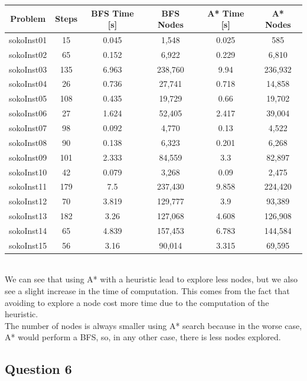 \documentclass[a4paper,10pt]{article}
\begin{document}
			\begin{tabular}{|c||c||c|c||c|c|}
				\hline 
				\textbf{Problem} & \textbf{Steps} & \textbf{BFS Time [s]} & \textbf{BFS Nodes} & \textbf{A* Time [s]} & \textbf{A* Nodes} \\ 
				\hline 
				sokoInst01 & 15 & 0.045 & 1,548 & 0.025 & 585 \\ 
				\hline
				sokoInst02 & 65 & 0.152 & 6,922 & 0.229 & 6,810 \\ 
				\hline
				sokoInst03 & 135 & 6.963 & 238,760 & 9.94 & 236,932 \\ 
				\hline
				sokoInst04 & 26 & 0.736 & 27,741 & 0.718 & 14,858 \\ 
				\hline
				sokoInst05 & 108 & 0.435 & 19,729 & 0.66 & 19,702 \\ 
				\hline
				sokoInst06 & 27 & 1.624 & 52,405 & 2.417 & 39,004 \\ 
				\hline
				sokoInst07 & 98 & 0.092 & 4,770 & 0.13 & 4,522 \\ 
				\hline
				sokoInst08 & 90 & 0.138 & 6,323 & 0.201 & 6,268 \\ 
				\hline
				sokoInst09 & 101 & 2.333 & 84,559 & 3.3 & 82,897 \\ 
				\hline
				sokoInst10 & 42 & 0.079 & 3,268 & 0.09 & 2,475 \\ 
				\hline
				sokoInst11 & 179 & 7.5 & 237,430 & 9.858 & 224,420 \\ 
				\hline
				sokoInst12 & 70 & 3.819 & 129,777 & 3.9 & 93,389 \\ 
				\hline
				sokoInst13 & 182 & 3.26 & 127,068 & 4.608 & 126,908 \\ 
				\hline
				sokoInst14 & 65 & 4.839 & 157,453 & 6.783 & 144,584 \\ 
				\hline
				sokoInst15 & 56 & 3.16 & 90,014 & 3.315 & 69,595 \\ 
				\hline
			\end{tabular}\\
			
			We can see that using A* with a heuristic lead to explore less nodes, but we also see a slight increase in the time of computation. This comes from the fact that avoiding to explore a node cost more time due to the computation of the heuristic.\\
			The number of nodes is always smaller using A* search because in the worse case, A* would perform a BFS, so, in any other case, there is less nodes explored.
			
		
		\subsection{Question 6}
		
\end{document}
